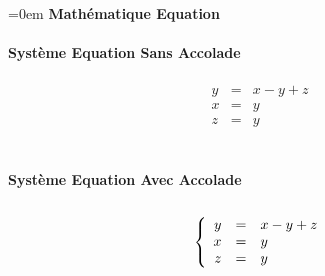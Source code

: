 \documentclass{article}
\begin{document}
\parindent=0em
\textbf{Mathématique Equation} \\ \\
\textbf{Système Equation Sans Accolade} \\ \\
\begin{eqnarray}
y &=& x - y + z\\
x &=& y\\
z &=& y
\end{eqnarray} \\ \\
\textbf{Système Equation Avec Accolade} \\ \\
$$\left \{
\begin{array}{r c l}
y &=& x - y + z\\
x &=& y\\
z &=& y
\end{array}
\right.$$ \\ \\
\end{document}
